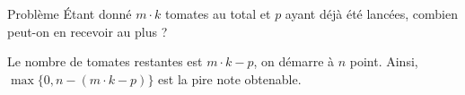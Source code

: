 \begin{frame}
    \frametitle{\problemtitle}
    \begin{block}{Problème}
        Étant donné $m \cdot k$ tomates au total et $p$ ayant déjà été lancées, combien peut-on en recevoir au plus ?
    \end{block}
    \pause
    Le nombre de tomates restantes est $m \cdot k - p$, on démarre à $n$ point. Ainsi, $\max\{0, n - (m \cdot k - p)\}$ est la pire note obtenable.
\end{frame}
